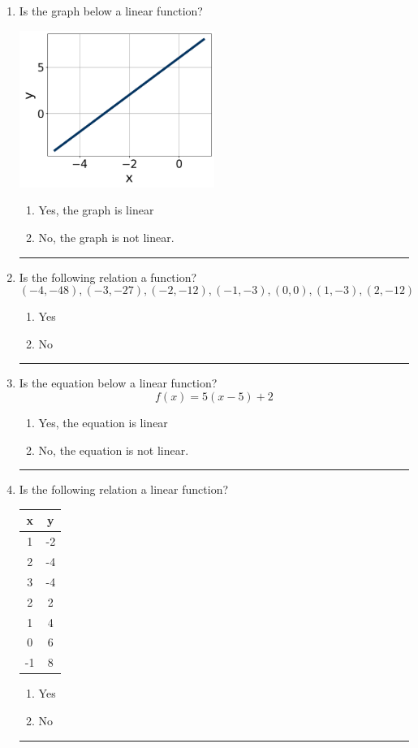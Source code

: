 \documentclass[14pt]{extbook}
\newcommand{\litem}[1]{\item#1\hspace*{-1cm}\rule{\textwidth}{0.4pt}}
\begin{document}
\begin{enumerate}
\litem{
Is the graph below a linear function?
\begin{center}
    \includegraphics[width=0.5\textwidth]{../Figures/MA_8_F_1_2_graphX.png}
\end{center}
\begin{enumerate}[label=\Alph*.]
\item Yes, the graph is linear
\item No, the graph is not linear.

\end{enumerate} }
\litem{
Is the following relation a function?\[ (-4, -48), (-3, -27), (-2, -12), (-1, -3), (0, 0), (1, -3), (2, -12) \]\begin{enumerate}[label=\Alph*.]
\item Yes
\item No

\end{enumerate} }
\litem{
Is the equation below a linear function?\[ f(x) = 5(x -5)+2 \]\begin{enumerate}[label=\Alph*.]
\item Yes, the equation is linear
\item No, the equation is not linear.

\end{enumerate} }
\litem{
Is the following relation a linear function?

\begin{tabular}{c|c}
x &y\tabularnewline \hline
1 &-2\tabularnewline \hline
2 &-4\tabularnewline \hline
3 &-4\tabularnewline \hline
2 &2\tabularnewline \hline
1 &4\tabularnewline \hline
0 &6\tabularnewline \hline
-1 &8\end{tabular}\begin{enumerate}[label=\Alph*.]
\item Yes
\item No

\end{enumerate} }
\end{enumerate}
\end{document}
